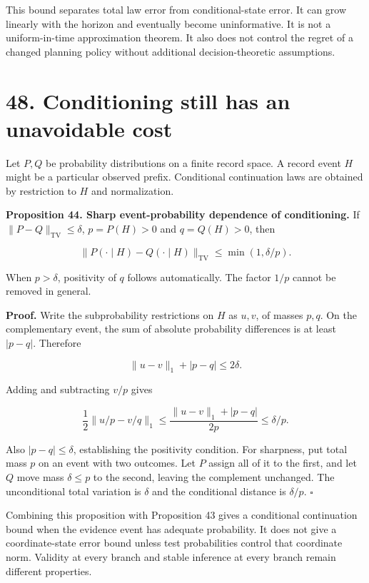 \documentclass[11pt,letterpaper]{article}
\begin{document}
This bound separates total law error from conditional-state error. It
can grow linearly with the horizon and eventually become uninformative.
It is not a uniform-in-time approximation theorem. It also does not
control the regret of a changed planning policy without additional
decision-theoretic assumptions.

\section{48. Conditioning still has an unavoidable
cost}\label{conditioning-still-has-an-unavoidable-cost}

Let \(P,Q\) be probability distributions on a finite record space. A
record event \(H\) might be a particular observed prefix. Conditional
continuation laws are obtained by restriction to \(H\) and
normalization.

\textbf{Proposition 44. Sharp event-probability dependence of
conditioning.} If \(\|P-Q\|_{\mathrm{TV}}\leq\delta\), \(p=P(H)>0\) and
\(q=Q(H)>0\), then

\[
\boxed{\|P(\cdot\mid H)-Q(\cdot\mid H)\|_{\mathrm{TV}}
\leq\min(1,\delta/p).}
\]

When \(p>\delta\), positivity of \(q\) follows automatically. The factor
\(1/p\) cannot be removed in general.

\textbf{Proof.} Write the subprobability restrictions on \(H\) as
\(u,v\), of masses \(p,q\). On the complementary event, the sum of
absolute probability differences is at least \(|p-q|\). Therefore

\[
\|u-v\|_1+|p-q|\leq2\delta.
\]

Adding and subtracting \(v/p\) gives

\[
\frac12\|u/p-v/q\|_1
\leq\frac{\|u-v\|_1+|p-q|}{2p}
\leq\delta/p.
\]

Also \(|p-q|\leq\delta\), establishing the positivity condition. For
sharpness, put total mass \(p\) on an event with two outcomes. Let \(P\)
assign all of it to the first, and let \(Q\) move mass \(\delta\leq p\)
to the second, leaving the complement unchanged. The unconditional total
variation is \(\delta\) and the conditional distance is \(\delta/p\).
\(\square\)

Combining this proposition with Proposition 43 gives a conditional
continuation bound when the evidence event has adequate probability. It
does not give a coordinate-state error bound unless test probabilities
control that coordinate norm. Validity at every branch and stable
inference at every branch remain different properties.
\end{document}
